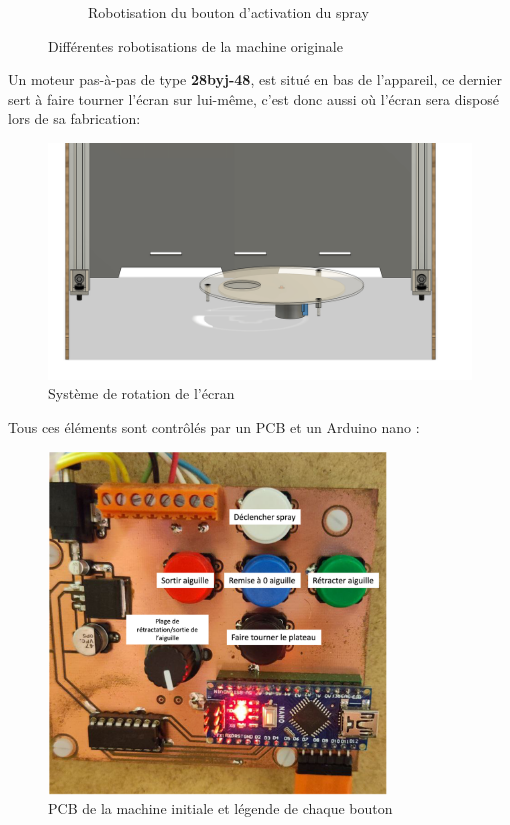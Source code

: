 \begin{figure}[H]
\begin{subfigure}{.65\textwidth}
        \caption{Robotisation du bouton d'activation du spray}
        \label{fig:robot_spray}
    \end{subfigure}
    \caption{Différentes robotisations de la machine originale}
    \label{fig:robotisations_aerographe}
\end{figure}

Un moteur pas-à-pas de type \textbf{28byj-48}, est situé en bas de l'appareil, ce dernier sert à faire tourner l'écran sur lui-même,
c'est donc aussi où l'écran sera disposé lors de sa fabrication:
\begin{figure}[H]
    \centering
    \includegraphics[width = \textwidth]{assets/figures/situation_initiale/rotation_ecran_initiale.png}
    \caption[Rotation écran initiale]{Système de rotation de l'écran}

\end{figure}

\newpage
Tous ces éléments sont contrôlés par un PCB et un Arduino nano :
\begin{figure}[H]
    \centering
    \includegraphics[width = 0.8\textwidth]{assets/figures/situation_initiale/PCB_machine_originale.png}
    \caption[PCB machine initiale]{PCB de la machine initiale et légende de chaque bouton}\label{PCB_machine_initial}
\end{figure}

